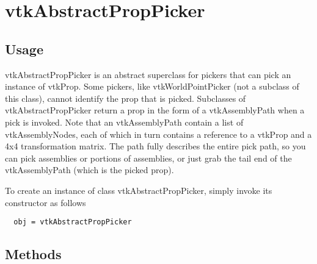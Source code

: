 \section{vtkAbstractPropPicker}

\subsection{Usage}

 vtkAbstractPropPicker is an abstract superclass for pickers that can pick
 an instance of vtkProp. Some pickers, like vtkWorldPointPicker (not a
 subclass of this class), cannot identify the prop that is
 picked. Subclasses of vtkAbstractPropPicker return a prop in the form of a
 vtkAssemblyPath when a pick is invoked. Note that an vtkAssemblyPath
 contain a list of vtkAssemblyNodes, each of which in turn contains a
 reference to a vtkProp and a 4x4 transformation matrix. The path fully
 describes the entire pick path, so you can pick assemblies or portions of
 assemblies, or just grab the tail end of the vtkAssemblyPath (which is the
 picked prop).

To create an instance of class vtkAbstractPropPicker, simply
invoke its constructor as follows
\begin{verbatim}
  obj = vtkAbstractPropPicker
\end{verbatim}
\subsection{Methods}

